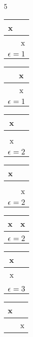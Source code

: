 \documentclass[a4paper  , 6 pt]{article}
\begin{document}
\begin{tiny}
\begin{multicols} {5}
\newline 
\begin{tabular}{|c | c| }
 \cline{1-1}  \\ \hline
x &  \\ \hline 
 & x  \\
\hline
\multicolumn{2}{|c|}{$\epsilon = 1$} \\ \hline
\end{tabular}
\begin{tabular}{|c | c| }
 \cline{1-1}  \\ \hline
 & x \\ \hline 
 & x  \\
\hline
\multicolumn{2}{|c|}{$\epsilon = 1$} \\ \hline
\end{tabular}
\begin{tabular}{|c | c| }
 \cline{1-1} x \\ \hline
 &  \\ \hline 
x &   \\
\hline
\multicolumn{2}{|c|}{$\epsilon = 2$} \\ \hline
\end{tabular} \newline
\begin{tabular}{|c | c| }
 \cline{1-1} x \\ \hline
 &  \\ \hline 
 & x  \\
\hline
\multicolumn{2}{|c|}{$\epsilon = 2$} \\ \hline
\end{tabular}
\begin{tabular}{|c | c| }
 \cline{1-1}  \\ \hline
x &  x \\ \hline 
 &   \\
\hline
\multicolumn{2}{|c|}{$\epsilon = 2$} \\ \hline
\end{tabular}
\begin{tabular}{|c | c| }
 \cline{1-1} x \\ \hline
x &  \\ \hline 
 &   \\
\hline
\multicolumn{2}{|c|}{$\epsilon = 3$} \\ \hline
\end{tabular} \newline
\begin{tabular}{|c | c| }
 \cline{1-1} x \\ \hline
 & x \\ \hline 

\end{tabular}
\end{multicols}
\end{tiny}
\end{document}
